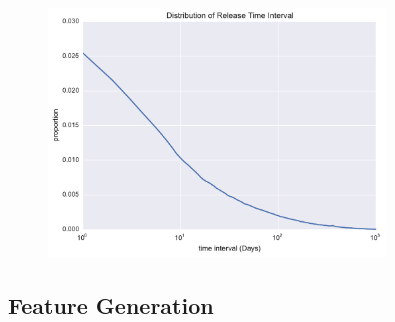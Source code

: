 \begin{figure}[!htb]
    \centering
    \includegraphics[width=0.8\textwidth]{fig/release_related}
    \caption{}
    \label{fig:release_relate}
\end{figure}

\subsection{Feature Generation}
\label{sec:6.2}

